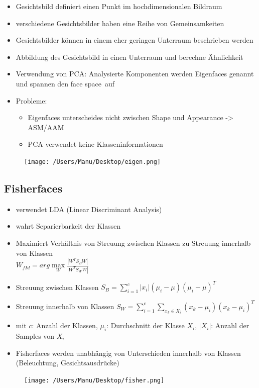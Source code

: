 \documentclass[paper=a4, fontsize=11pt]{scrartcl} %
\numberwithin{equation}{section} %
\numberwithin{figure}{section} %
\numberwithin{table}{section} %
\begin{document}
\begin{minipage}{0.65\textwidth}
\begin{itemize}
\item Gesichtsbild definiert einen Punkt im hochdimensionalen Bildraum
\item verschiedene Gesichtsbilder haben eine Reihe von Gemeinsamkeiten
\item Gesichtsbilder können in einem eher geringen Unterraum beschrieben werden
\item Abbildung des Gesichtsbild in einen Unterraum und berechne Ähnlichkeit
\item Verwendung von PCA: Analysierte Komponenten werden Eigenfaces genannt und spannen den \glqq face space\grqq\ auf
\item Probleme:
\begin{itemize}
\item Eigenfaces unterscheides nicht zwischen Shape und Appearance -> ASM/AAM
\item PCA verwendet keine Klasseninformationen
\end{itemize}
\end{itemize}
\end{minipage} \hfill
\begin{minipage}{0.3\textwidth}
\begin{figure}[H]
\texttt{[image: /Users/Manu/Desktop/eigen.png]}
\end{figure}
\end{minipage}

\subsection{Fisherfaces}

\begin{minipage}{0.65\textwidth}
\begin{itemize}
\item verwendet LDA (Linear Discriminant Analysis)
\item wahrt Separierbarkeit der Klassen
\item Maximiert Verhältnis von Streuung zwischen Klassen zu Streuung innerhalb von Klassen\\ 
$W_{fId} = arg\max\limits_W \frac{|W^T S_B W|}{|W^T S_W W|}$
\item Streuung zwischen Klassen
$S_B = \sum\limits_{i=1}^c |x_i| (\mu_i - \mu) (\mu_i-\mu)^T$
\item Streuung innerhalb von Klassen
$S_W = \sum\limits_{i=1}^c \sum\limits_{x_k \in X_i} (x_k - \mu_i) (x_k - \mu_i)^T$
\item mit $c$: Anzahl der Klassen, $\mu_i$: Durchschnitt der Klasse $X_i$, $|X_i|$: Anzahl der Samples von $X_i$
\item Fisherfaces werden unabhängig von Unterschieden innerhalb von Klassen (Beleuchtung, Gesichtsausdrücke)
\end{itemize}
\end{minipage} \hfill
\begin{minipage}{0.3\textwidth}
\begin{figure}[H]
\texttt{[image: /Users/Manu/Desktop/fisher.png]}
\end{figure}
\end{minipage}
\end{document}
